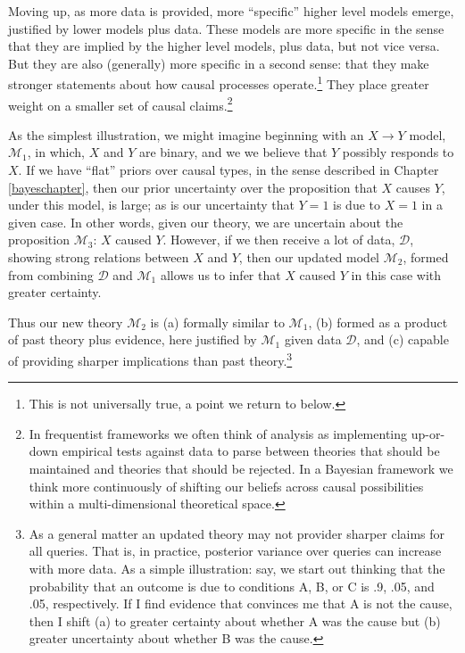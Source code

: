 \documentclass[
  12pt,
]{book}
\begin{document}
Moving up, as more data is provided, more ``specific'' higher level models emerge, justified by lower models plus data. These models are more specific in the sense that they are implied by the higher level models, plus data, but not vice versa. But they are also (generally) more specific in a second sense: that they make stronger statements about how causal processes operate.\footnote{This is not universally true, a point we return to below.} They place greater weight on a smaller set of causal claims.\footnote{In frequentist frameworks we often think of analysis as implementing up-or-down empirical tests against data to parse between theories that should be maintained and theories that should be rejected. In a Bayesian framework we think more continuously of shifting our beliefs across causal possibilities within a multi-dimensional theoretical space.}

As the simplest illustration, we might imagine beginning with an \(X\rightarrow Y\) model, \(\mathcal M_1\), in which, \(X\) and \(Y\) are binary, and we we believe that \(Y\) possibly responds to \(X\). If we have ``flat'' priors over causal types, in the sense described in Chapter \ref{bayeschapter}, then our prior uncertainty over the proposition that \(X\) causes \(Y\), under this model, is large; as is our uncertainty that \(Y=1\) is due to \(X=1\) in a given case. In other words, given our theory, we are uncertain about the proposition \(\mathcal M_3\): \(X\) caused \(Y\). However, if we then receive a lot of data, \(\mathcal D\), showing strong relations between \(X\) and \(Y\), then our updated model \(\mathcal M_2\), formed from combining \(\mathcal D\) and \(\mathcal M_1\) allows us to infer that \(X\) caused \(Y\) in this case with greater certainty.

Thus our new theory \(\mathcal M_2\) is (a) formally similar to \(\mathcal M_1\), (b) formed as a product of past theory plus evidence, here justified by \(\mathcal M_1\) given data \(\mathcal D\), and (c) capable of providing sharper implications than past theory.\footnote{As a general matter an updated theory may not provider sharper claims for all queries. That is, in practice, posterior variance over queries can increase with more data. As a simple illustration: say, we start out thinking that the probability that an outcome is due to conditions A, B, or C is .9, .05, and .05, respectively. If I find evidence that convinces me that A is not the cause, then I shift (a) to greater certainty about whether A was the cause but (b) greater uncertainty about whether B was the cause.}
\end{document}
